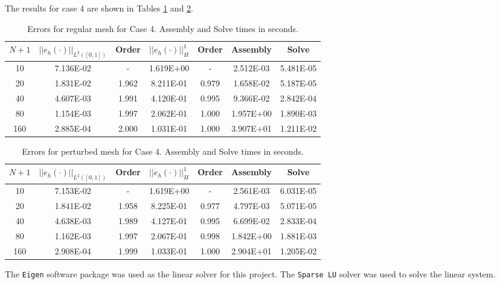 \documentclass[a4paper, 12pt]{article}
\begin{document}
The results for case 4 are shown in Tables \ref{tab:C4o}
and \ref{tab:C4p}. 

\begin{table}[!ht]
\caption{Errors for regular mesh for Case 4. Assembly and Solve times in seconds.}
\vspace{0.1in}
\centering
\begin{tabular}{|c|c|c|c|c|c|c|}
\hline
 $N+1$&  $||e_h(\cdot)||_{L^2([0,1])}$ & Order & $||e_h(\cdot)||_H^1$ & Order & Assembly & Solve \\
 \hline
     10   & 7.136E-02 &  -      & 1.619E+00 &  -     & 2.512E-03 & 5.481E-05 \\
     20   & 1.831E-02 &  1.962  & 8.211E-01 &  0.979 & 1.658E-02 & 5.187E-05 \\
     40   & 4.607E-03 &  1.991  & 4.120E-01 &  0.995 & 9.366E-02 & 2.842E-04 \\
     80   & 1.154E-03 &  1.997  & 2.062E-01 &  1.000 & 1.957E+00 & 1.890E-03 \\
     160  & 2.885E-04 &  2.000  & 1.031E-01 &  1.000 & 3.907E+01 & 1.211E-02 \\
\hline
\end{tabular}
\label{tab:C4o}
\end{table}

\begin{table}[!ht]
\caption{Errors for perturbed mesh for Case 4. Assembly and Solve times in seconds.}
\vspace{0.1in}
\centering
\begin{tabular}{|c|c|c|c|c|c|c|}
\hline
 $N+1$&  $||e_h(\cdot)||_{L^2([0,1])}$ & Order & $||e_h(\cdot)||_H^1$ & Order & Assembly & Solve \\
 \hline
     10   & 7.153E-02 & -     & 1.619E+00 &  -     & 2.561E-03 & 6.031E-05 \\
     20   & 1.841E-02 & 1.958 & 8.225E-01 &  0.977 & 4.797E-03 & 5.071E-05 \\
     40   & 4.638E-03 & 1.989 & 4.127E-01 &  0.995 & 6.699E-02 & 2.833E-04 \\
     80   & 1.162E-03 & 1.997 & 2.067E-01 &  0.998 & 1.842E+00 & 1.881E-03 \\
     160  & 2.908E-04 & 1.999 & 1.033E-01 &  1.000 & 2.904E+01 & 1.205E-02 \\
\hline
\end{tabular}
\label{tab:C4p}
\end{table}


The \texttt{Eigen} software package
was used as the linear solver for this project. 
The \texttt{Sparse LU} solver was used to 
solve the linear system.
\end{document}
